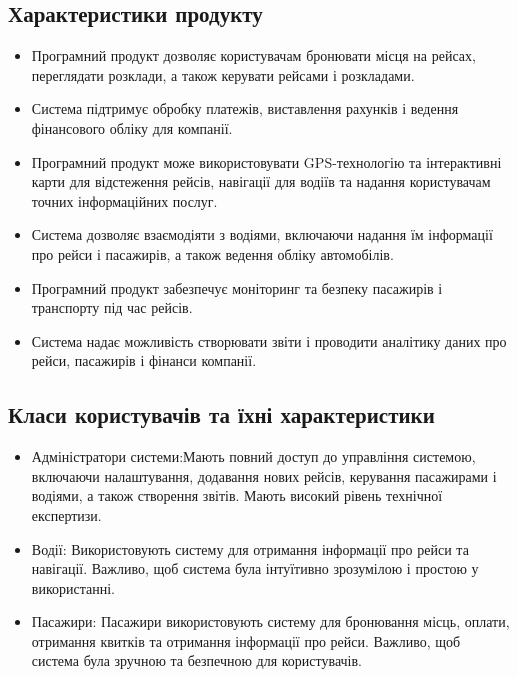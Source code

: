 \documentclass[14pt]{extreport}
\begin{document}
\begin{normalsize}
	\subsection*{Характеристики продукту}
	\begin{itemize}
		\item Програмний продукт дозволяє користувачам бронювати місця на рейсах, переглядати розклади, а також керувати рейсами і розкладами.
		\item Система підтримує обробку платежів, виставлення рахунків і ведення фінансового обліку для компанії.
		\item Програмний продукт може використовувати GPS-технологію та інтерактивні карти для відстеження рейсів, навігації для водіїв та надання користувачам точних інформаційних послуг.
		\item Система дозволяє взаємодіяти з водіями, включаючи надання їм інформації про рейси і пасажирів, а також ведення обліку автомобілів.
		\item Програмний продукт забезпечує моніторинг та безпеку пасажирів і транспорту під час рейсів.
		\item Система надає можливість створювати звіти і проводити аналітику даних про рейси, пасажирів і фінанси компанії.
	\end{itemize}
	
	\subsection*{Класи користувачів та їхні характеристики}
	\begin{itemize}
		\item Адміністратори системи:Мають повний доступ до управління системою, включаючи налаштування, додавання нових рейсів, керування пасажирами і водіями, а також створення звітів. Мають високий рівень технічної експертизи.
		\item Водії: Використовують систему для отримання інформації про рейси та навігації. Важливо, щоб система була інтуїтивно зрозумілою і простою у використанні.
		\item Пасажири: Пасажири використовують систему для бронювання місць, оплати, отримання квитків та отримання інформації про рейси. Важливо, щоб система була зручною та безпечною для користувачів.
	\end{itemize}
	

\end{normalsize}
\end{document}
